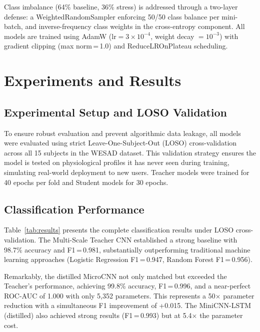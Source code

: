 \documentclass[conference]{IEEEtran}
\begin{document}
Class imbalance (64\% baseline, 36\% stress) is addressed through a two-layer defense: a WeightedRandomSampler enforcing 50/50 class balance per mini-batch, and inverse-frequency class weights in the cross-entropy component. All models are trained using AdamW ($\text{lr}=3\times10^{-4}$, weight decay $=10^{-3}$) with gradient clipping (max norm\,=\,1.0) and ReduceLROnPlateau scheduling.

\section{Experiments and Results}

\subsection{Experimental Setup and LOSO Validation}

To ensure robust evaluation and prevent algorithmic data leakage, all models were evaluated using strict Leave-One-Subject-Out (LOSO) cross-validation across all 15 subjects in the WESAD dataset. This validation strategy ensures the model is tested on physiological profiles it has never seen during training, simulating real-world deployment to new users. Teacher models were trained for 40 epochs per fold and Student models for 30 epochs.

\subsection{Classification Performance}

Table~\ref{tab:results} presents the complete classification results under LOSO cross-validation. The Multi-Scale Teacher CNN established a strong baseline with 98.7\% accuracy and F1\,=\,0.981, substantially outperforming traditional machine learning approaches (Logistic Regression F1\,=\,0.947, Random Forest F1\,=\,0.956).

Remarkably, the distilled MicroCNN not only matched but exceeded the Teacher's performance, achieving 99.8\% accuracy, F1\,=\,0.996, and a near-perfect ROC-AUC of 1.000 with only 5,352 parameters. This represents a 50$\times$ parameter reduction with a simultaneous F1 improvement of +0.015. The MiniCNN-LSTM (distilled) also achieved strong results (F1\,=\,0.993) but at 5.4$\times$ the parameter cost.
\end{document}

